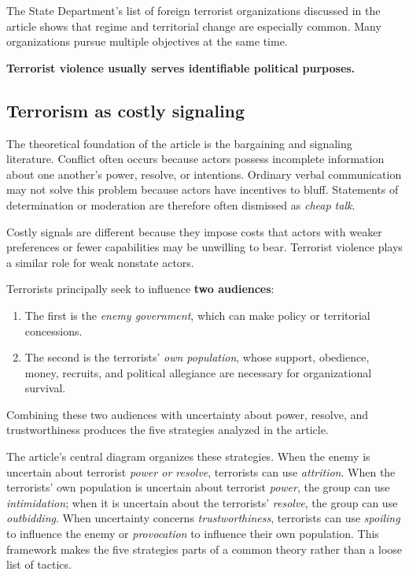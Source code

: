 The State Department's list of foreign terrorist organizations discussed in the article shows that regime and territorial change are especially common. Many organizations pursue multiple objectives at the same time.

\textbf{Terrorist violence usually serves identifiable political purposes.}

\subsection{Terrorism as costly signaling}

The theoretical foundation of the article is the bargaining and signaling literature. Conflict often occurs because actors possess incomplete information about one another's power, resolve, or intentions. Ordinary verbal communication may not solve this problem because actors have incentives to bluff. Statements of determination or moderation are therefore often dismissed as \textit{cheap talk}.

Costly signals are different because they impose costs that actors with weaker preferences or fewer capabilities may be unwilling to bear. Terrorist violence plays a similar role for weak nonstate actors.

Terrorists principally seek to influence \textbf{two audiences}:
\begin{enumerate}
    \item The first is the \textit{enemy government}, which can make policy or territorial concessions.
    
    \item The second is the terrorists' \textit{own population}, whose support, obedience, money, recruits, and political allegiance are necessary for organizational survival.
\end{enumerate}
Combining these two audiences with uncertainty about power, resolve, and trustworthiness produces the five strategies analyzed in the article.

The article's central diagram organizes these strategies. When the enemy is uncertain about terrorist \textit{power or resolve}, terrorists can use \textit{attrition}. When the terrorists' own population is uncertain about terrorist \textit{power}, the group can use \textit{intimidation}; when it is uncertain about the terrorists' \textit{resolve}, the group can use \textit{outbidding}. When uncertainty concerns \textit{trustworthiness}, terrorists can use \textit{spoiling} to influence the enemy or \textit{provocation} to influence their own population. This framework makes the five strategies parts of a common theory rather than a loose list of tactics.

